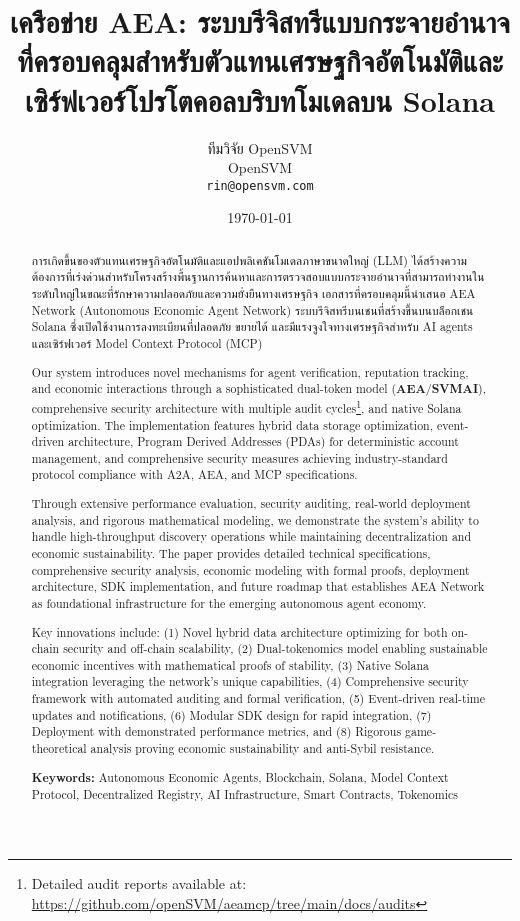 \documentclass[12pt,a4paper]{article}
\title{เครือข่าย AEA: ระบบรีจิสทรีแบบกระจายอำนาจที่ครอบคลุมสำหรับตัวแทนเศรษฐกิจอัตโนมัติและเซิร์ฟเวอร์โปรโตคอลบริบทโมเดลบน Solana}
\author{ทีมวิจัย OpenSVM\\
OpenSVM\\
\texttt{rin@opensvm.com}}
\date{\today}
\begin{document}
\maketitle

\begin{abstract}
การเกิดขึ้นของตัวแทนเศรษฐกิจอัตโนมัติและแอปพลิเคชันโมเดลภาษาขนาดใหญ่ (LLM) ได้สร้างความต้องการที่เร่งด่วนสำหรับโครงสร้างพื้นฐานการค้นหาและการตรวจสอบแบบกระจายอำนาจที่สามารถทำงานในระดับใหญ่ในขณะที่รักษาความปลอดภัยและความยั่งยืนทางเศรษฐกิจ เอกสารที่ครอบคลุมนี้นำเสนอ AEA Network (Autonomous Economic Agent Network) ระบบรีจิสทรีบนเชนที่สร้างขึ้นบนบล็อกเชน Solana ซึ่งเปิดใช้งานการลงทะเบียนที่ปลอดภัย ขยายได้ และมีแรงจูงใจทางเศรษฐกิจสำหรับ AI agents และเซิร์ฟเวอร์ Model Context Protocol (MCP)

Our system introduces novel mechanisms for agent verification, reputation tracking, and economic interactions through a sophisticated dual-token model (\textbf{AEA}/\textbf{SVMAI}), comprehensive security architecture with multiple audit cycles\footnote{Detailed audit reports available at: \url{https://github.com/openSVM/aeamcp/tree/main/docs/audits}}, and native Solana optimization. The implementation features hybrid data storage optimization, event-driven architecture, Program Derived Addresses (PDAs) for deterministic account management, and comprehensive security measures achieving industry-standard protocol compliance with A2A, AEA, and MCP specifications.

Through extensive performance evaluation, security auditing, real-world deployment analysis, and rigorous mathematical modeling, we demonstrate the system's ability to handle high-throughput discovery operations while maintaining decentralization and economic sustainability. The paper provides detailed technical specifications, comprehensive security analysis, economic modeling with formal proofs, deployment architecture, SDK implementation, and future roadmap that establishes AEA Network as foundational infrastructure for the emerging autonomous agent economy.

Key innovations include: (1) Novel hybrid data architecture optimizing for both on-chain security and off-chain scalability, (2) Dual-tokenomics model enabling sustainable economic incentives with mathematical proofs of stability, (3) Native Solana integration leveraging the network's unique capabilities, (4) Comprehensive security framework with automated auditing and formal verification, (5) Event-driven real-time updates and notifications, (6) Modular SDK design for rapid integration, (7) Deployment with demonstrated performance metrics, and (8) Rigorous game-theoretical analysis proving economic sustainability and anti-Sybil resistance.

\textbf{Keywords:} Autonomous Economic Agents, Blockchain, Solana, Model Context Protocol, Decentralized Registry, AI Infrastructure, Smart Contracts, Tokenomics
\end{abstract}
\end{document}
